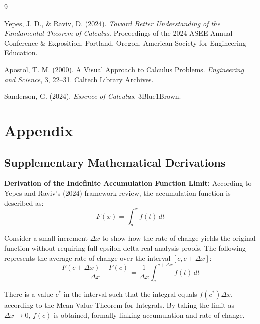 \documentclass[11pt, a4paper]{article}
\begin{document}
\newpage
\begin{thebibliography}{9}

Yepes, J. D., \& Raviv, D. (2024). \textit{Toward Better Understanding of the Fundamental Theorem of Calculus}. Proceedings of the 2024 ASEE Annual Conference \& Exposition, Portland, Oregon. American Society for Engineering Education.

Apostol, T. M. (2000). A Visual Approach to Calculus Problems. \textit{Engineering and Science}, 3, 22--31. Caltech Library Archives.

Sanderson, G. (2024). \textit{Essence of Calculus}. 3Blue1Brown.

\end{thebibliography}

\newpage
\appendix
\section{Appendix}
\label{sec:appendix}

\subsection{Supplementary Mathematical Derivations}
\label{subsec:app_derivations}
\textbf{Derivation of the Indefinite Accumulation Function Limit:} According to Yepes and Raviv's (2024) framework review, the accumulation function is described as:
\begin{equation}
    \label{eq:accumulation_function}
    F(x) = \int_{a}^{x} f(t) \, dt
\end{equation}

Consider a small increment $\Delta x$ to show how the rate of change yields the original function without requiring full epsilon-delta real analysis proofs. The following represents the average rate of change over the interval $[c, c+\Delta x]$:
\begin{equation}
    \label{eq:avg_rate_of_change}
    \frac{F(c+\Delta x) - F(c)}{\Delta x} = \frac{1}{\Delta x} \int_{c}^{c+\Delta x} f(t) \, dt
\end{equation}

There is a value $c^*$ in the interval such that the integral equals $f(c^*)\Delta x$, according to the Mean Value Theorem for Integrals. By taking the limit as $\Delta x \to 0$, $f(c)$ is obtained, formally linking accumulation and rate of change.
\end{document}
